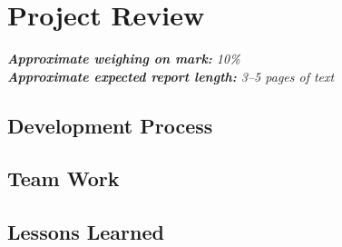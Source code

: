 \section{Project Review}
\label{sec:project review}

\emph{\textbf{Approximate weighing on mark:} 10\%}							\\
\emph{\textbf{Approximate expected report length:} 3--5 pages of text}

\subsection{Development Process}


\subsection{Team Work}


\subsection{Lessons Learned}




